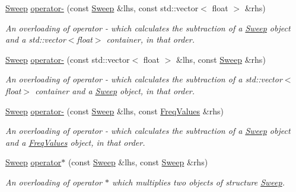 \begin{DoxyCompactItemize}
\mbox{\label{structSweep_a8b2585969a3c379f744b662fb3bea749}} 
\hyperlink{structSweep}{Sweep} \hyperlink{structSweep_a8b2585969a3c379f744b662fb3bea749}{operator-\/} (const \hyperlink{structSweep}{Sweep} \&lhs, const std\+::vector$<$ float $>$ \&rhs)
\begin{DoxyCompactList}\small\item\em An overloading of operator -\/ which calculates the subtraction of a {\itshape \hyperlink{structSweep}{Sweep}} object and a {\ttfamily std\+::vector$<$float$>$} container, in that order. \end{DoxyCompactList}\item 
\mbox{\label{structSweep_a840a49afd7973b4b3d1020e15c4c9819}} 
\hyperlink{structSweep}{Sweep} \hyperlink{structSweep_a840a49afd7973b4b3d1020e15c4c9819}{operator-\/} (const std\+::vector$<$ float $>$ \&lhs, const \hyperlink{structSweep}{Sweep} \&rhs)
\begin{DoxyCompactList}\small\item\em An overloading of operator -\/ which calculates the subtraction of a {\ttfamily std\+::vector$<$float$>$} container and a {\itshape \hyperlink{structSweep}{Sweep}} object, in that order. \end{DoxyCompactList}\item 
\mbox{\label{structSweep_a124ea929f6dba249bd4d6bf5476ab621}} 
\hyperlink{structSweep}{Sweep} \hyperlink{structSweep_a124ea929f6dba249bd4d6bf5476ab621}{operator-\/} (const \hyperlink{structSweep}{Sweep} \&lhs, const \hyperlink{structFreqValues}{Freq\+Values} \&rhs)
\begin{DoxyCompactList}\small\item\em An overloading of operator -\/ which calculates the subtraction of a {\itshape \hyperlink{structSweep}{Sweep}} object and a {\itshape \hyperlink{structFreqValues}{Freq\+Values}} object, in that order. \end{DoxyCompactList}\item 
\mbox{\label{structSweep_a4739da92a36e5f8f17b0be140dd327f6}} 
\hyperlink{structSweep}{Sweep} \hyperlink{structSweep_a4739da92a36e5f8f17b0be140dd327f6}{operator$\ast$} (const \hyperlink{structSweep}{Sweep} \&lhs, const \hyperlink{structSweep}{Sweep} \&rhs)
\begin{DoxyCompactList}\small\item\em An overloading of operator $\ast$ which multiplies two objects of structure {\itshape \hyperlink{structSweep}{Sweep}}. \end{DoxyCompactList}\item 

\end{DoxyCompactItemize}
